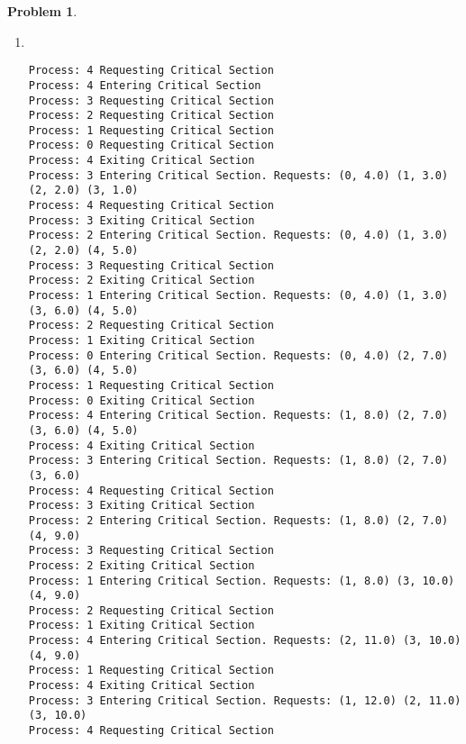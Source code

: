 \documentclass{article}
\theoremstyle{problemstyle}
\newtheorem{problem}{Problem}
\begin{document}
\begin{problem}
\begin{enumerate}[label=(\alph*)]
\begin{lstlisting}
Process: 4 Exiting Critical Section
Process: 1 Entering Critical Section. Requests: (1, 9.0) (2, 9.0) (3, 9.0)
Process: 4 Requesting Critical Section
Process: 1 Exiting Critical Section
Process: 2 Entering Critical Section. Requests: (2, 9.0) (3, 9.0) (4, 9.0)
Process: 2 Exiting Critical Section
Process: 3 Entering Critical Section. Requests: (3, 9.0) (4, 9.0)
Process: 3 Exiting Critical Section
Process: 4 Entering Critical Section. Requests: (4, 9.0)
Process: 4 Exiting Critical Section
Process: 0 Requesting Critical Section
Process: 0 Entering Critical Section
Process: 0 Exiting Critical Section
Process: 0 Requesting Critical Section
Process: 0 Entering Critical Section
Process: 0 Exiting Critical Section
\end{lstlisting}
\item~
\begin{lstlisting}
Process: 4 Requesting Critical Section
Process: 4 Entering Critical Section
Process: 3 Requesting Critical Section
Process: 2 Requesting Critical Section
Process: 1 Requesting Critical Section
Process: 0 Requesting Critical Section
Process: 4 Exiting Critical Section
Process: 3 Entering Critical Section. Requests: (0, 4.0) (1, 3.0) (2, 2.0) (3, 1.0)
Process: 4 Requesting Critical Section
Process: 3 Exiting Critical Section
Process: 2 Entering Critical Section. Requests: (0, 4.0) (1, 3.0) (2, 2.0) (4, 5.0)
Process: 3 Requesting Critical Section
Process: 2 Exiting Critical Section
Process: 1 Entering Critical Section. Requests: (0, 4.0) (1, 3.0) (3, 6.0) (4, 5.0)
Process: 2 Requesting Critical Section
Process: 1 Exiting Critical Section
Process: 0 Entering Critical Section. Requests: (0, 4.0) (2, 7.0) (3, 6.0) (4, 5.0)
Process: 1 Requesting Critical Section
Process: 0 Exiting Critical Section
Process: 4 Entering Critical Section. Requests: (1, 8.0) (2, 7.0) (3, 6.0) (4, 5.0)
Process: 4 Exiting Critical Section
Process: 3 Entering Critical Section. Requests: (1, 8.0) (2, 7.0) (3, 6.0)
Process: 4 Requesting Critical Section
Process: 3 Exiting Critical Section
Process: 2 Entering Critical Section. Requests: (1, 8.0) (2, 7.0) (4, 9.0)
Process: 3 Requesting Critical Section
Process: 2 Exiting Critical Section
Process: 1 Entering Critical Section. Requests: (1, 8.0) (3, 10.0) (4, 9.0)
Process: 2 Requesting Critical Section
Process: 1 Exiting Critical Section
Process: 4 Entering Critical Section. Requests: (2, 11.0) (3, 10.0) (4, 9.0)
Process: 1 Requesting Critical Section
Process: 4 Exiting Critical Section
Process: 3 Entering Critical Section. Requests: (1, 12.0) (2, 11.0) (3, 10.0)
Process: 4 Requesting Critical Section

\end{lstlisting}
\end{enumerate}
\end{problem}
\end{document}
